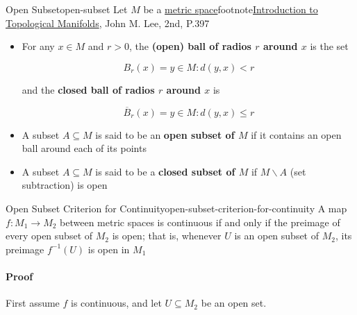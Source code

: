 \begin{Definition}{Open Subset}{open-subset}
    Let $M$ be a \hyperref[def:metrix-space]{metric space}footnote{\href{https://trello.com/c/SI33o8fG}{Introduction to Topological Manifolds}, John M. Lee, 2nd, P.397}

    \begin{itemize}
        \item For any $x \in M$ and $r > 0$, the \textbf{(open) ball of radios $r$ around $x$} is the set

              \begin{equation}
                  B_r(x) = {y \in M : d(y, x) < r}
              \end{equation}

              and the \textbf{closed ball of radios $r$ around $x$} is

              \begin{equation}
                  \overline{B}_r(x) = {y \in M : d(y, x) \le r}
              \end{equation}

        \item A subset $A \subseteq M$ is said to be an \textbf{open subset of $M$} if it contains an open ball around
              each of its points
        \item A subset $A \subseteq M$ is said to be a \textbf{closed subset of $M$} if $M \smallsetminus A$ (set
              subtraction) is open
    \end{itemize}
\end{Definition}

\begin{Theorem}{Open Subset Criterion for Continuity}{open-subset-criterion-for-continuity}
    A map $f: M_1 \rightarrow M_2$ between metric spaces is continuous if and only if the preimage of every open subset
    of $M_2$ is open; that is, whenever $U$ is an open subset of $M_2$, its preimage $f^{-1}(U)$ is open in $M_1$
\end{Theorem}

\paragraph{Proof} First assume $f$ is continuous, and let $U \subseteq M_2$ be an open set.

